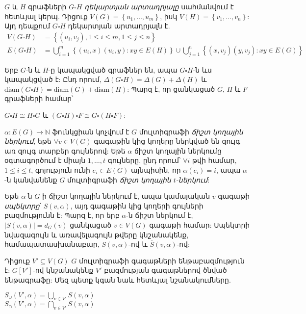 \bigskip

$G$ և $H$ գրաֆների $G\square H$ \textit{դեկարտյան արտադրյալը} սահմանվում է հետևյալ կերպ.
Դիցուք $V(G)=\left\{u_1,\ldots,u_m\right\}$, իսկ $V(H)=\left\{v_1,\ldots,v_n\right\}$: Այդ դեպքում $G\square H$ դեկարտյան արտադրյալն է.
\begin{align*}
V(G \square H) &= \left\{ (u_i,v_j), 1\leq i\leq m, 1\leq j\leq n \right\} \\
E(G \square H) &= \bigcup\limits_{i=1}^{m}\left\{(u_i,x)(u_i,y) : xy \in E(H) \right\} \cup 
\bigcup\limits_{j=1}^{n}\left\{(x,v_j)(y,v_j) : xy \in E(G) \right\}
\end{align*}

Երբ $G$-ն և $H$-ը կապակցված գրաֆներ են, ապա $G\square H$-ն ևս կապակցված է: Ընդ որում, $\Delta(G\square H)=\Delta(G)+\Delta(H)$ և $\mathrm{diam}(G\square H)=\mathrm{diam}(G)+\mathrm{diam}(H)$: Պարզ է, որ ցանկացած $G$, $H$ և $F$ գրաֆների համար՝
\begin{center}
$G \square H \cong H \square G$ և $(G \square H) \square F \cong G \square (H \square F)$:
\end{center}



\bigskip

$\alpha : E(G) \rightarrow \mathbb{N}$ ֆունկցիան կոչվում է $G$ մուլտիգրաֆի \textit{ճիշտ կողային ներկում}, եթե $\forall v \in V(G)$ գագաթին կից կողերը ներկված են զույգ առ զույգ տարբեր գույներով:
Եթե $\alpha$ ճիշտ կողային ներկումը օգտագործում է միայն $1,\ldots,t$ գույները, ընդ որում՝ $\forall i$ թվի համար, $1 \leq i \leq t$, գոյություն ունի $e_i \in E(G)$ այնպիսին, որ $\alpha(e_i)=i$, ապա $\alpha$-ն կանվանենք $G$ մուլտիգրաֆի \textit{ճիշտ կողային $t$-ներկում}:

Եթե $\alpha$-ն $G$-ի ճիշտ կողային ներկում է, ապա կամայական $v$ գագաթի \textit{սպեկտրը}՝ $S(v,\alpha)$, այդ գագաթին կից կողերի գույների բազմությունն է: Պարզ է, որ երբ $\alpha$-ն ճիշտ ներկում է, $|S(v,\alpha)|=d_G(v)$ ցանկացած $v \in V(G)$ գագաթի համար: Սպեկտրի նվազագույն և առավելագույն թվերը կնշանակենք, համապատասխանաբար, $\underline{S}(v, \alpha)$-ով և $\overline{S}(v, \alpha)$-ով:

Դիցուք $V' \subseteq V(G)$ $G$ մուլտիգրաֆի գագաթների ենթաբազմություն է: $G[V']$-ով կնշանակենք $V'$ բազմության գագաթներով ծնված ենթագրաֆը: Մեզ պետք կգան նաև հետևյալ նշանակումները.
\begin{center}
	$S_\cup(V',\alpha) = \bigcup\limits_{v \in V'}{S(v,\alpha)}$ \\
	$S_\cap(V',\alpha) = \bigcap\limits_{v \in V'}{S(v,\alpha)}$
\end{center}

